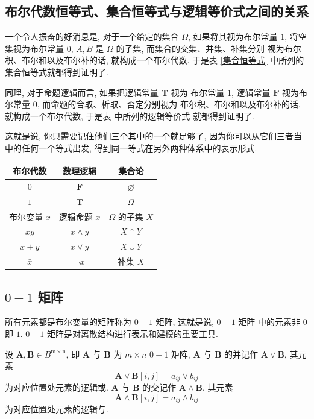 \documentclass[10pt,UTF8]{book} %
\begin{document}
\subsection{布尔代数恒等式、集合恒等式与逻辑等价式之间的关系}

一个令人振奋的好消息是, 对于一个给定的集合 $\varOmega$, 如果将其视为布尔常量 $1$,
将空集视为布尔常量 $0$, $A,B$ 是 $\varOmega$ 的子集, 而集合的交集、并集、补集分别
视为布尔积、布尔和以及布尔补的话, 就构成一个布尔代数. 于是表 \ref{集合恒等式} 中所列的
集合恒等式就都得到证明了. 

同理, 对于命题逻辑而言, 如果把逻辑常量 $\mathbf{T}$ 视为
布尔常量 $1$, 逻辑常量 $\mathbf{F}$ 视为布尔常量 $0$, 而命题的合取、析取、否定分别视为
布尔积、布尔和以及布尔补的话, 就构成一个布尔代数, 于是表 中所列的逻辑等价式
就都得到证明了.

这就是说, 你只需要记住他们三个其中的一个就足够了, 因为你可以从它们三者当中的任何一个等式出发,
得到同一等式在另外两种体系中的表示形式.

{ %
\label{布尔代数、集合运算与逻辑运算之间的关系} %
\begin{longtable}{ccc}
    \toprule
    \textbf{布尔代数} & \textbf{数理逻辑} & \textbf{集合论} \\
    \toprule
    \endhead
    \bottomrule
    \endfoot

    $0$ & $\mathbf{F}$ & $\varnothing$ \\ 
    $1$ & $\mathbf{T}$ & $\varOmega$ \\ 
    布尔变量 $x$ & 逻辑命题 $x$ & $\Omega$ 的子集 $X$ \\
    $xy$ & $x \wedge y$ & $X \cap Y$ \\ 
    $x+y$ & $x \vee y$ & $X \cup Y$ \\
    $\bar x$ & $\lnot x$ & 补集 $\bar X$ \\
\end{longtable}}

\subsection{$0-1$ 矩阵}

所有元素都是布尔变量的矩阵称为 $0-1$ 矩阵, 这就是说, $0-1$ 矩阵
中的元素非 $0$ 即 $1$. $0-1$ 矩阵是对离散结构进行表示和建模的重要工具.

\begin{definition}
    设 $\boldsymbol{A}, \boldsymbol{B} \in B^\mathrm{m \times n}$,
    即 $\boldsymbol{A}$ 与 $\boldsymbol{B}$ 为 $m \times n$ $0-1$ 矩阵,
    $\boldsymbol{A}$ 与 $\boldsymbol{B}$ 的并记作
    $\boldsymbol{A} \vee \boldsymbol{B}$, 其元素
    \[ \boldsymbol{A} \vee \boldsymbol{B}[i,j]
    = a_{ij} \vee b_{ij} \]
    为对应位置处元素的逻辑或.
    $\boldsymbol{A}$ 与 $\boldsymbol{B}$ 的交记作
    $\boldsymbol{A} \wedge \boldsymbol{B}$, 其元素
    \[ \boldsymbol{A} \wedge \boldsymbol{B}[i,j]
    = a_{ij} \wedge b_{ij} \]
    为对应位置处元素的逻辑与.
\end{definition}
\end{document}

